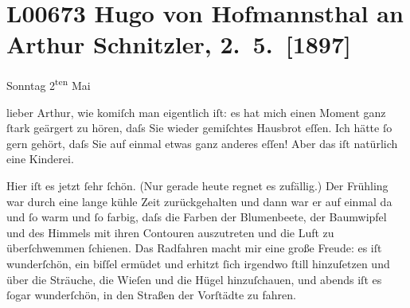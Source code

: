 

\section[Hugo von Hofmannsthal an Arthur Schnitzler, 2. 5. {[}1897{]}]{L00673 Hugo von Hofmannsthal an Arthur Schnitzler, 2. 5. {[}1897{]}}
\nopagebreak{}
\rehead{ }\normalsize\beginnumbering{}
\toendnotes[C]{\smallbreak\pagebreak[2]}
\toendnotes[C]{\smallbreak}
\toendnotes[C]{\smallbreak}
\pstart
           {\pb}\textcolor{gray}{\textbf{\label{T_L00673-1v}\label{T_L00673-1}}}\pend
           
\pstart
           \raggedleft{}Sonntag 2\textsuperscript{ten} Mai\pend
           
\pstart{}lieber Arthur,\pend\vspace{0.5em}
\pstart
           wie komiſch man eigentlich iſt: es hat mich einen Moment ganz{ }ſtark geärgert zu
               hören, daſs Sie wieder gemiſchtes Hausbrot eſſen. Ich hätte{ }ſo gern gehört, daſs Sie
               auf einmal etwas ganz anderes eſſen! Aber das iſt natürlich eine Kinderei.\pend
           
\pstart
           Hier iſt es jetzt{ }ſehr{ }ſchön. (Nur gerade heute regnet es zufällig.) Der Frühling war
                  {\pb}durch eine lange kühle Zeit
               zurückgehalten und dann war er auf einmal da und{ }ſo warm und{ }ſo farbig, daſs die
               Farben der Blumenbeete, der Baumwipfel und des Himmels mit ihren Contouren
               auszutreten und die Luft zu überſchwemmen{ }ſchienen. Das Radfahren macht mir eine
               große Freude: es iſt wunderſchön, ein biſſel ermüdet und erhitzt{ }ſich irgendwo{ }ſtill
               hinzuſetzen {\pb}und über die
               Sträuche, die Wieſen und die Hügel hinzuſchauen, und abends iſt es{ }ſogar wunderſchön,
               in den Straßen der Vorſtädte zu fahren.\pend
           

